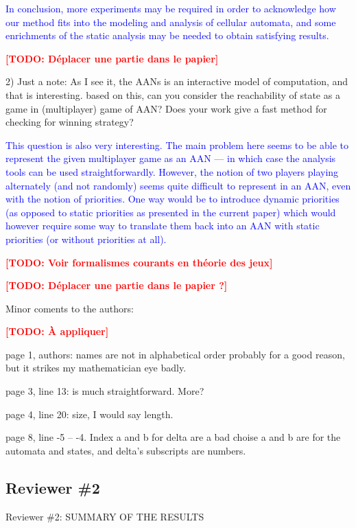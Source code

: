 \documentclass[11pt]{article}
\newcommand{\todo}[1]{\textcolor{red}{\textbf{[TODO: #1]}}}
\newcommand{\ilanswer}[1]{\textcolor{blue}{#1}}
\newcommand{\answer}[1]{\ilanswer{#1}\vspace*{1em}}
\begin{document}
\answer{In conclusion,
more experiments may be required in order to acknowledge how our method fits into the modeling and analysis of cellular automata,
and some enrichments of the static analysis may be needed to obtain satisfying results.
}

\todo{Déplacer une partie dans le papier}



2) Just a note: As I see it, the AANs is an interactive model of computation, and that is interesting. based on this, can you consider the reachability of state as a game in (multiplayer) game of AAN? Does  your work give a fast method for checking for winning strategy?   

\answer{This question is also very interesting.
The main problem here seems to be able to represent the given multiplayer game as an AAN ---
in which case the analysis tools can be used straightforwardly.
However, the notion of two players playing alternately (and not randomly) seems quite difficult
to represent in an AAN, even with the notion of priorities.
One way would be to introduce dynamic priorities (as opposed to static priorities as presented in the current paper) which would however require some way to translate them back into an AAN with static priorities (or without priorities at all).
}

\todo{Voir formalismes courants en théorie des jeux}

\todo{Déplacer une partie dans le papier ?}



Minor coments to the authors:

\todo{À appliquer}

page 1, authors: names are not in alphabetical order probably for a good reason, but it strikes my mathematician eye badly.

page 3, line 13: is much straightforward. More?

page 4, line 20: size, I would say length.

page 8, line -5 -- -4. Index a and b for delta are a bad choise a and b are for the automata and states, and delta's subscripts are numbers.



\subsection*{Reviewer \#2}



Reviewer \#2: SUMMARY OF THE RESULTS
\end{document}
